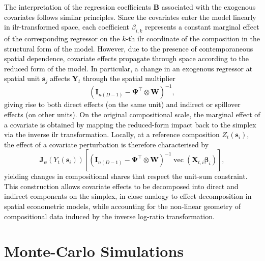 \documentclass[12pt]{article}
\theoremstyle{plain}
\theoremstyle{definition}
\DeclareMathOperator{\vop}{vec}
\newcommand{\xvec}{\boldsymbol}
\newcommand{\xmat}{\mathbf}
\begin{document}
\textcolor{black}{The interpretation of the regression coefficients $\xmat{B}$ associated with the exogenous covariates follows similar principles. Since the covariates enter the model linearly in ilr-transformed space, each coefficient $\beta_{i,k}$ represents a constant marginal effect of the corresponding regressor on the $k$-th ilr coordinate of the composition in the structural form of the model.} \textcolor{black}{However, due to the presence of contemporaneous spatial dependence, covariate effects propagate through space according to the reduced form of the model. In particular, a change in an exogenous regressor at spatial unit $\xvec{s}_j$ affects $\xmat{Y}_t$ through the spatial multiplier
\[
\left(\xmat{I}_{n(D-1)}-\xmat{\Psi}^\top\!\otimes \xmat{W}\right)^{-1},
\]
giving rise to both direct effects (on the same unit) and indirect or spillover effects (on other units).} \textcolor{black}{On the original compositional scale, the marginal effect of a covariate is obtained by mapping the reduced-form impact back to the simplex via the inverse ilr transformation. Locally, at a reference composition $Z_t(\xvec{s}_i)$, the effect of a covariate perturbation is therefore characterised by
\[
\mathbf{J}_\psi(Y_t(\xvec{s}_i))
\left[
\left(\xmat{I}_{n(D-1)}-\xmat{\Psi}^\top\!\otimes \xmat{W}\right)^{-1}
\vop(\xmat{X}_{t,i}\xvec{\beta}_i)
\right],
\]
yielding changes in compositional shares that respect the unit-sum constraint. This construction allows covariate effects to be decomposed into direct and indirect components on the simplex, in close analogy to effect decomposition in spatial econometric models, while accounting for the non-linear geometry of compositional data induced by the inverse log-ratio transformation.}












\section{Monte-Carlo Simulations}\label{sec:sim}
\end{document}
